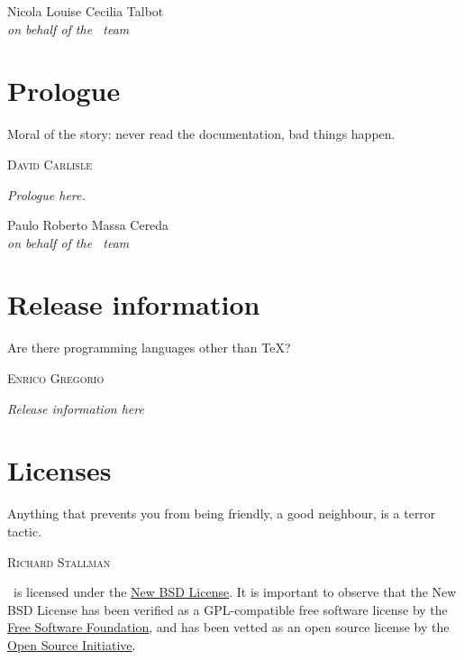 \documentclass[a4paper,twoside,12pt]{memoir}
\begin{document}
\begin{flushright}
Nicola Louise Cecilia Talbot\\
\emph{on behalf of the \arara\ team}
\end{flushright}

\chapter*{Prologue}
\label{chap:prologue}

\epigraph{Moral of the story: never read the documentation, bad things happen.}{\textsc{David Carlisle}}

\emph{Prologue here.}

\vfill

\begin{flushright}
Paulo Roberto Massa Cereda\\
\emph{on behalf of the \arara\ team}
\end{flushright}

\chapter*{Release information}
\label{chap:releaseinformation}

\epigraph{Are there programming languages other than \TeX?}{\textsc{Enrico Gregorio}}

\emph{Release information here}

\chapter*{Licenses}
\label{chap:licenses}

\epigraph{Anything that prevents you from being friendly, a good neighbour, is a terror tactic.}{\textsc{Richard Stallman}}

\arara\ is licensed under the \href{http://www.opensource.org/licenses/bsd-license.php}{New BSD License}. It is important to observe that the New BSD License has been verified as a GPL-compatible free software license by the \href{http://www.fsf.org/}{Free Software Foundation}, and has been vetted as an open source license by the \href{http://www.opensource.org/}{Open Source Initiative}.
\end{document}
